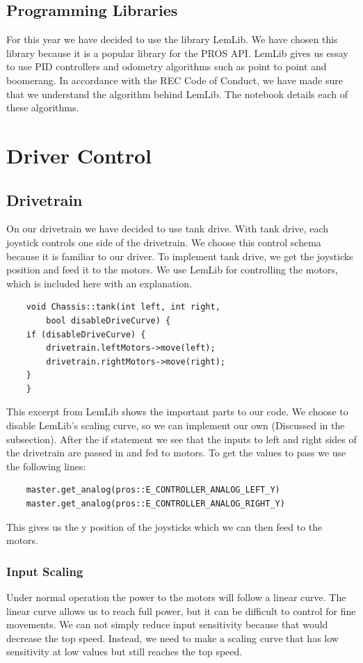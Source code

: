 \documentclass[12pt]{report}
\begin{document}
\section{Programming Libraries}
For this year we have decided to use the library LemLib.
We have chosen this library because it is a popular library for the PROS API. 
LemLib gives us essay to use PID controllers and odometry algorithms such as point to point and boomerang.
In accordance with the REC Code of Conduct, 
    we have made sure that we understand the algorithm behind LemLib. 
The notebook details each of these algorithms.

\chapter{Driver Control}
\section{Drivetrain}
On our drivetrain we have decided to use tank drive.
With tank drive, each joystick controls one side of the drivetrain.
We choose this control schema because it is familiar to our driver.
To implement tank drive,
    we get the joysticks position and feed it to the motors.
We use LemLib for controlling the motors,
    which is included here with an explanation.
\begin{verbatim}
    void Chassis::tank(int left, int right, 
        bool disableDriveCurve) {
    if (disableDriveCurve) {
        drivetrain.leftMotors->move(left);
        drivetrain.rightMotors->move(right);
    }
    }
\end{verbatim}

This excerpt from LemLib shows the important parts to our code.
We choose to disable LemLib's scaling curve, so we can implement our own
    (Discussed in the subsection).
After the if statement we see that the inputs to left and right
    sides of the drivetrain are passed in and fed to motors.
To get the values to pass we use the following lines:
\begin{verbatim}
    master.get_analog(pros::E_CONTROLLER_ANALOG_LEFT_Y)
    master.get_analog(pros::E_CONTROLLER_ANALOG_RIGHT_Y)
\end{verbatim}
This gives us the y position of the joysticks which we can then
    feed to the motors.

\subsection{Input Scaling}
Under normal operation the power to the motors will follow a
    linear curve.
The linear curve allows us to reach full power,
    but it can be difficult to control for fine movements.
We can not simply reduce input sensitivity because that would
    decrease the top speed.
Instead, we need to make a scaling curve that has low
    sensitivity at low values but still reaches the top speed.
\end{document}
